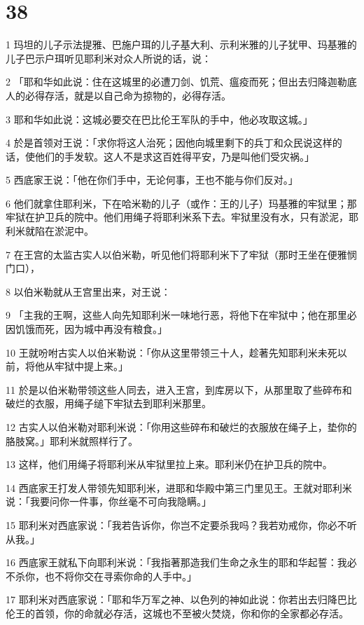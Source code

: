 \chapter{38}

\par 1 玛坦的儿子示法提雅、巴施户珥的儿子基大利、示利米雅的儿子犹甲、玛基雅的儿子巴示户珥听见耶利米对众人所说的话，说：
\par 2 「耶和华如此说：住在这城里的必遭刀剑、饥荒、瘟疫而死；但出去归降迦勒底人的必得存活，就是以自己命为掠物的，必得存活。
\par 3 耶和华如此说：这城必要交在巴比伦王军队的手中，他必攻取这城。」
\par 4 於是首领对王说：「求你将这人治死；因他向城里剩下的兵丁和众民说这样的话，使他们的手发软。这人不是求这百姓得平安，乃是叫他们受灾祸。」
\par 5 西底家王说：「他在你们手中，无论何事，王也不能与你们反对。」
\par 6 他们就拿住耶利米，下在哈米勒的儿子（或作：王的儿子）玛基雅的牢狱里；那牢狱在护卫兵的院中。他们用绳子将耶利米系下去。牢狱里没有水，只有淤泥，耶利米就陷在淤泥中。
\par 7 在王宫的太监古实人以伯米勒，听见他们将耶利米下了牢狱（那时王坐在便雅悯门口），
\par 8 以伯米勒就从王宫里出来，对王说：
\par 9 「主我的王啊，这些人向先知耶利米一味地行恶，将他下在牢狱中；他在那里必因饥饿而死，因为城中再没有粮食。」
\par 10 王就吩咐古实人以伯米勒说：「你从这里带领三十人，趁著先知耶利米未死以前，将他从牢狱中提上来。」
\par 11 於是以伯米勒带领这些人同去，进入王宫，到库房以下，从那里取了些碎布和破烂的衣服，用绳子缒下牢狱去到耶利米那里。
\par 12 古实人以伯米勒对耶利米说：「你用这些碎布和破烂的衣服放在绳子上，垫你的胳肢窝。」耶利米就照样行了。
\par 13 这样，他们用绳子将耶利米从牢狱里拉上来。耶利米仍在护卫兵的院中。
\par 14 西底家王打发人带领先知耶利米，进耶和华殿中第三门里见王。王就对耶利米说：「我要问你一件事，你丝毫不可向我隐瞒。」
\par 15 耶利米对西底家说：「我若告诉你，你岂不定要杀我吗？我若劝戒你，你必不听从我。」
\par 16 西底家王就私下向耶利米说：「我指著那造我们生命之永生的耶和华起誓：我必不杀你，也不将你交在寻索你命的人手中。」
\par 17 耶利米对西底家说：「耶和华万军之神、以色列的神如此说：你若出去归降巴比伦王的首领，你的命就必存活，这城也不至被火焚烧，你和你的全家都必存活。

